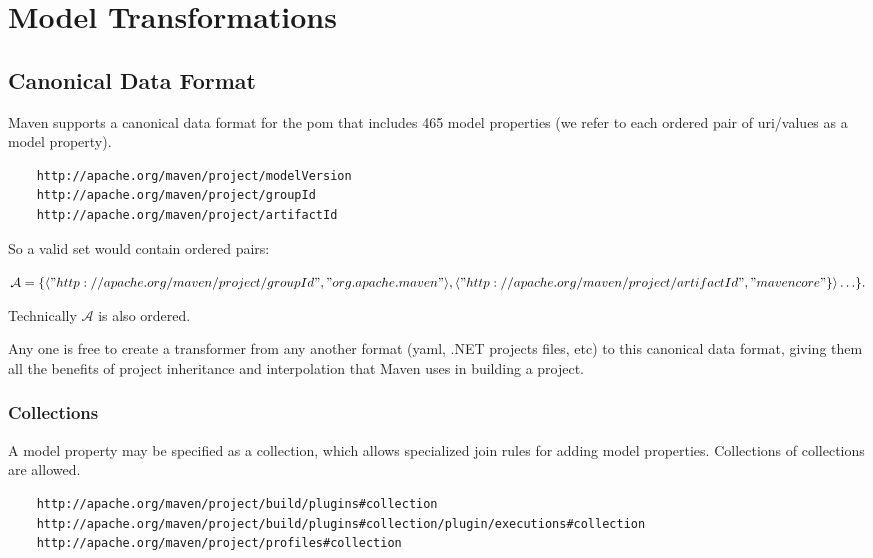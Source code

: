 \documentclass[12pt]{amsart}
\title{}
\author{}
\date{} %
\begin{document}
\maketitle
\tableofcontents
\section{Model Transformations}
\subsection{Canonical Data Format}
Maven supports a canonical data format for the pom that includes 465 model properties (we refer to each ordered pair of uri/values as a model property). 

\begin{verbatim}
	http://apache.org/maven/project/modelVersion
	http://apache.org/maven/project/groupId
	http://apache.org/maven/project/artifactId
\end{verbatim}

So a valid set would contain ordered pairs:

\begin{math}
	\mathcal{A}= \{\langle "http://apache.org/maven/project/groupId", "org.apache.maven"\rangle,   
	\langle "http://apache.org/maven/project/artifactId", "mavencore"\}\rangle \ldots\}.
\end{math}

Technically \begin{math}\mathcal{A}\end{math} is also ordered.

Any one is free to create a transformer from any another format (yaml, .NET projects files, etc) to this canonical data format, giving them all the benefits of project inheritance and interpolation that Maven uses in building a project.

\subsubsection{Collections}
A model property may  be specified as a collection, which allows specialized join rules for adding model properties. Collections of collections are allowed.
\begin{verbatim}
	http://apache.org/maven/project/build/plugins#collection
	http://apache.org/maven/project/build/plugins#collection/plugin/executions#collection
	http://apache.org/maven/project/profiles#collection
\end{verbatim}
  
\end{document}

